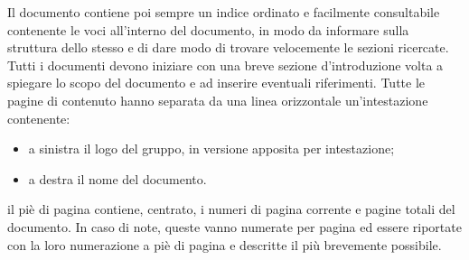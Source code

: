 	    Il documento contiene poi sempre un indice ordinato e facilmente consultabile contenente le voci all'interno del documento, in modo da informare sulla struttura dello stesso e di dare modo di trovare velocemente le sezioni ricercate.
	    Tutti i documenti devono iniziare con una breve sezione d'introduzione volta a spiegare lo scopo del documento e ad inserire eventuali riferimenti.
	    Tutte le pagine di contenuto hanno separata da una linea orizzontale un'intestazione contenente:
	    \begin{itemize}
	        \item a sinistra il logo del gruppo, in versione apposita per intestazione;
	        \item a destra il nome del documento.
	    \end{itemize}
	    il piè di pagina contiene, centrato, i numeri di pagina corrente e pagine totali del documento.
	    In caso di note, queste vanno numerate per pagina ed essere riportate con la loro numerazione a piè di pagina e descritte il più brevemente possibile.

